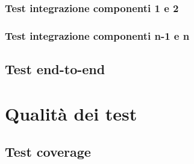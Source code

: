 \subsubsection{Test integrazione componenti 1 e 2}

\subsubsection{Test integrazione componenti n-1 e n}

\subsection{Test end-to-end}


\section{Qualit\`a dei test}


\subsection{Test coverage}

%
%

